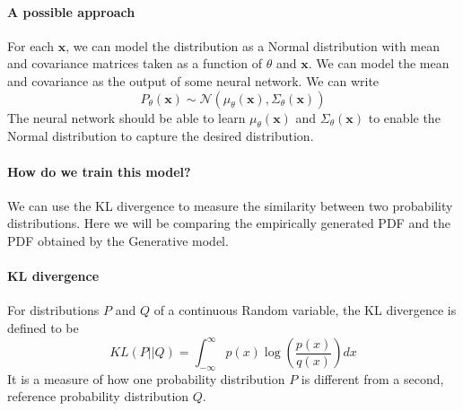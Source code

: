 \documentclass[12pt]{article}
\begin{document}
\paragraph{A possible approach}
For each $\mathbf{x}$, we can model the distribution as a Normal distribution with mean and covariance matrices taken as a function of $\theta$ and $\mathbf{x}$. We can model the mean and covariance as the output of some neural network. We can write 
\begin{equation*}
    P_{\theta}(\mathbf{x}) \sim \mathcal{N}(\mu_{\theta}(\mathbf{x}), \Sigma_{\theta}(\mathbf{x}))
\end{equation*}
The neural network should be able to learn $\mu_{\theta}(\mathbf{x})$ and $\Sigma_{\theta}(\mathbf{x})$ to enable the Normal distribution to capture the desired distribution.

\paragraph{How do we train this model?}
We can use the KL divergence to measure the similarity between two probability distributions. Here we will be comparing the empirically generated PDF and the PDF obtained by the Generative model.

\paragraph{KL divergence} For distributions $P$ and $Q$ of a continuous Random variable, the KL divergence is defined to be
\begin{equation*}
    KL(P || Q) = \int_{-\infty}^{\infty} p(x)\log{\left(\frac{p(x)}{q(x)}\right)}dx
\end{equation*} 
It is a measure of how one probability distribution $P$ is different from a second, reference probability distribution $Q$. 
\end{document}
